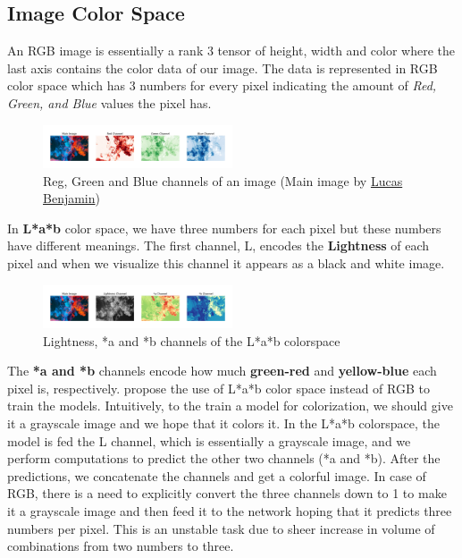 \documentclass[conference]{IEEEtran}
\begin{document}
\subsection{Image Color Space}
\hspace*{0.25 in}An RGB image is essentially a rank 3 tensor of height, width and color where the last axis contains the color data of our image. The data is represented in RGB color space which has 3 numbers for every pixel indicating the amount of \textit{Red, Green, and Blue} values the pixel has.
\begin{figure}[!htb]
\begin{center}
	\includegraphics[width=0.5\textwidth]{figures/rgb_colorspace}
	\caption{Reg, Green and Blue channels of an image (Main image by \href{https://unsplash.com/@aznbokchoy}{Lucas Benjamin})}
	\label{rgb_colorspace}
\end{center}
\end{figure}
In \textbf{L*a*b} color space, we have three numbers for each pixel but these numbers have different meanings. The first channel, L, encodes the \textbf{Lightness} of each pixel and when we visualize this channel it appears as a black and white image. 
\begin{figure}[!htb]
\begin{center}
	\includegraphics[width=0.5\textwidth]{figures/Lab_colorspace}
	\caption{Lightness, *a and *b channels of the L*a*b colorspace}
	\label{lab_colorspace}
\end{center}
\end{figure}
The \textbf{*a and *b} channels encode how much \textbf{green-red} and \textbf{yellow-blue} each pixel is, respectively.
\cite{guadarrama2017pixcolor,isola2018imagetoimage} propose the use of L*a*b color space instead of RGB to train the models. Intuitively, to the train a model for colorization, we should give it a grayscale image and we hope that it colors it. In the L*a*b colorspace, the model is fed the L channel, which is essentially a grayscale image, and we perform computations to predict the other two channels (*a and *b). After the predictions, we concatenate the channels and get a colorful image. In case of RGB, there is a need to explicitly convert the three channels down to 1 to make it a grayscale image and then feed it to the network hoping that it predicts three numbers per pixel. This is an unstable task due to sheer increase in volume of combinations from two numbers to three.
\end{document}
